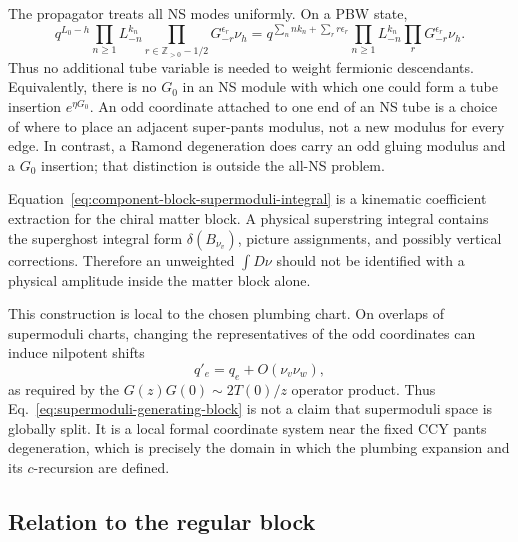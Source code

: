 \documentclass[11pt]{article}
\begin{document}
The propagator treats all NS modes uniformly.  On a PBW state,
\begin{equation}
 q^{L_0-h}
 \prod_{n\ge1}L_{-n}^{k_n}
 \prod_{r\in\mathbb Z_{>0}-1/2}G_{-r}^{\epsilon_r}\nu_h
 =q^{\sum_n nk_n+\sum_r r\epsilon_r}
 \prod_{n\ge1}L_{-n}^{k_n}
 \prod_rG_{-r}^{\epsilon_r}\nu_h.
 \label{eq:super-propagator-mode-grading}
\end{equation}
Thus no additional tube variable is needed to weight fermionic descendants.
Equivalently, there is no \(G_0\) in an NS module with which one could form
a tube insertion \(e^{\eta G_0}\).  An odd coordinate attached to one end
of an NS tube is a choice of where to place an adjacent super-pants modulus,
not a new modulus for every edge.  In contrast, a Ramond degeneration does
carry an odd gluing modulus and a \(G_0\) insertion; that distinction is
outside the all-NS problem.

Equation~\eqref{eq:component-block-supermoduli-integral} is a kinematic
coefficient extraction for the chiral matter block.  A physical superstring
integral contains the superghost integral form \(\delta(B_{\nu_v})\), picture
assignments, and possibly vertical corrections.  Therefore an unweighted
\(\int D\nu\) should not be identified with a physical amplitude inside the
matter block alone.

This construction is local to the chosen plumbing chart.  On overlaps of
supermoduli charts, changing the representatives of the odd coordinates can
induce nilpotent shifts
\begin{equation}
 q'_e=q_e+O(\nu_v\nu_w),
 \label{eq:nilpotent-even-modulus-shift}
\end{equation}
as required by the \(G(z)G(0)\sim2T(0)/z\) operator product.  Thus
Eq.~\eqref{eq:supermoduli-generating-block} is not a claim that supermoduli
space is globally split.  It is a local formal coordinate system near the
fixed CCY pants degeneration, which is precisely the domain in which the
plumbing expansion and its \(c\)-recursion are defined.


\subsection{Relation to the regular block}
\end{document}
